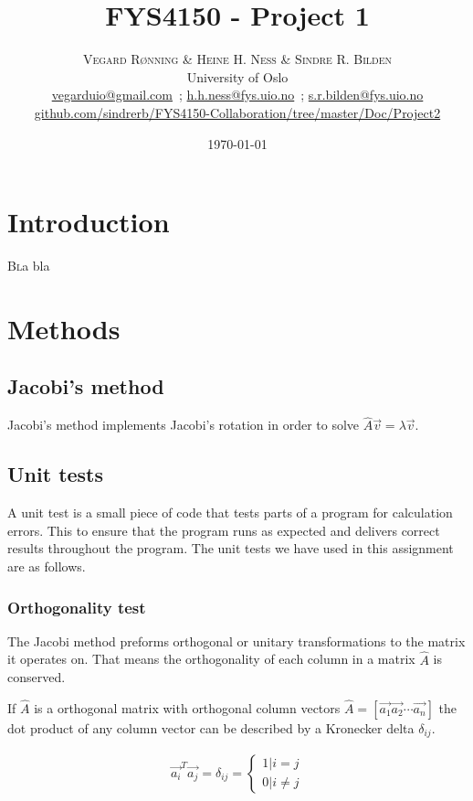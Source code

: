 \documentclass[twoside,twocolumn]{article}
\title{FYS4150 - Project 1} %
\author{%
	\textsc{Vegard Rønning \& Heine H. Ness \& Sindre R. Bilden} \\[1ex] %
	\normalsize University of Oslo \\ %
	\normalsize \href{mailto:vegarduio@gmail.com}{vegarduio@gmail.com}\ ; \href{mailto:h.h.ness@fys.uio.no}{h.h.ness@fys.uio.no}\ ; \href{mailto:s.r.bilden@fys.uio.no}{s.r.bilden@fys.uio.no}\\%
	\footnotesize \href{https://github.com/sindrerb/FYS4150-Collaboration/tree/master/Doc/Project2}{github.com/sindrerb/FYS4150-Collaboration/tree/master/Doc/Project2}
}
\date{\today} %
\newcommand{\nl}{
	
	\medskip
	\noindent
}
\begin{document}
	
	\maketitle
	
	
	\section{Introduction}
	\lettrine[nindent=0em,lines=3]{B}la bla
	
	\section{Methods}
	\subsection{Jacobi's method}
	Jacobi's method implements Jacobi's rotation in order to solve $\hat{A}\vec v=\lambda \vec v$. 
	
	
	\subsection{Unit tests}
	
	A unit test is a small piece of code that tests parts of a program for calculation errors. This to ensure that the program runs as expected and delivers correct results throughout the program. The unit tests we have used in this assignment are as follows.
	
	\subsubsection{Orthogonality test}
	
	The Jacobi method preforms orthogonal or unitary transformations to the matrix it operates on. That means the orthogonality of each column in a matrix $\hat{A}$ is conserved. 
	\nl
	If $\hat{A}$ is a orthogonal matrix with orthogonal column vectors $\hat{A} = [\vec{a_1} \vec{a_2} \cdots \vec{a_n}  ]$ the dot product of any column vector can be described by a Kronecker delta $\delta_{ij}$.
	
	\begin{align*}
	\vec{a_i}^T \vec{a_j} = \delta_{ij} =
	\begin{cases}
	1|i=j\\
	0|i\neq j
	\end{cases}
	\end{align*}
	
\end{document}
